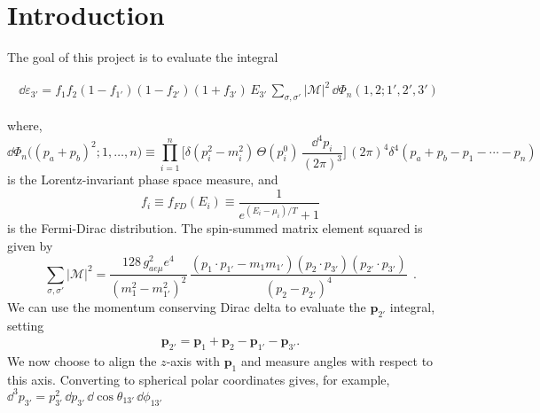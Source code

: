 \section{Introduction}\label{sec:introduction}
The goal of this project is to evaluate the integral 

\begin{bluenv}{}
    \begin{equation}
    \label{eq:emissivity-integral}
    \begin{aligned}
        \dd \varepsilon_{3'} = 
            f_1 f_2 (1 - f_{1'}) (1 - f_{2'}) (1 + f_{3'})
            \, E_{3'} \,
            \sum_{\sigma, \sigma'} | \mathcal{M} |^2 \,
            \dd \Phi_n(1, 2; 1', 2', 3') \; 
    \end{aligned}
    \end{equation}
\end{bluenv}
where, 
\begin{equation*}
    \dd \Phi_n \big((p_a + p_b)^2; 1, \ldots, n \big) \equiv 
    \prod_{i=1}^{n}
    \bigg[
         \delta (p_i^2 - m_i^2) \, \Theta(p_i^0) \, 
        \frac{\dd^4 p_i}{(2\pi)^3}
    \bigg] \, (2\pi)^4 \delta^4(p_a + p_b - p_1 - \cdots - p_n) \quad 
\end{equation*}
is the Lorentz-invariant phase space measure, and
\begin{equation*}
    f_i \equiv f_{FD}(E_i) \equiv \frac{1}{e^{(E_i - \mu_i)/T} + 1}
\end{equation*}
is the Fermi-Dirac distribution. 
The spin-summed matrix element squared is given by
\begin{equation}
    \label{eq:matrix-element}
    \sum_{\sigma, \sigma'} | \mathcal{M} |^2 
        = 
        \frac{128 \, g^2_{ae\mu} e^4}{(m_1^2 - m_{1'}^2)^2} \,
        \frac{
             (p_1 \cdot p_{1'} - m_1 m_{1'})
            (p_2 \cdot p_{3'})
            (p_{2'} \cdot p_{3'})
        }
        {
            (p_2 - p_{2'})^4
        } \; \, .
\end{equation}
We can use the momentum conserving Dirac delta to evaluate the $\bm{p}_{2'}$ integral, setting
\begin{align}
    \bm{p}_{2'} = \bm{p}_{1} + \bm{p}_{2} - \bm{p}_{1'} - \bm{p}_{3'}.
\end{align}
We now choose to align the $z$-axis with $\bm{p}_1$ and measure angles with respect to this axis. 
Converting to spherical polar coordinates gives, for example, $\dd^3 p_{3'} = p_{3'}^2 \, \dd p_{3'} \, \dd \cos \theta_{13'} \, \dd \phi_{13'}$
